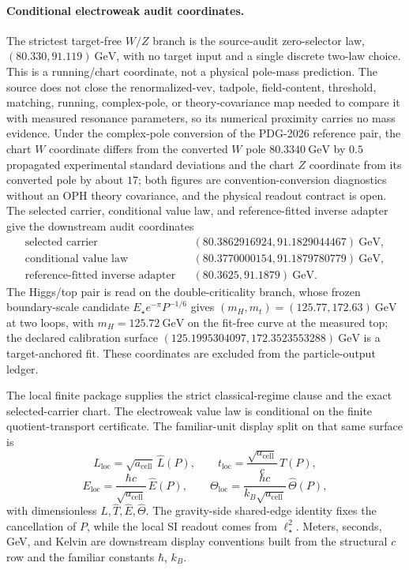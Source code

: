 \paragraph{Conditional electroweak audit coordinates.}
The strictest target-free \(W/Z\) branch is the source-audit zero-selector law,
\((80.330,91.119)~\mathrm{GeV}\), with no target input and a single discrete
two-law choice. This is a running/chart coordinate, not a physical pole-mass
prediction. The source does not close the renormalized-vev, tadpole,
field-content, threshold, matching, running, complex-pole, or theory-covariance
map needed to compare it with measured resonance parameters, so its numerical
proximity carries no mass evidence. Under the complex-pole conversion of the
PDG-2026 reference pair, the chart \(W\) coordinate differs from the converted
\(W\) pole \(80.3340~\mathrm{GeV}\) by \(0.5\) propagated experimental standard
deviations and the chart \(Z\) coordinate from its converted pole by about
\(17\); both figures are convention-conversion diagnostics without an OPH
theory covariance, and the physical readout contract is open. The
selected carrier, conditional value law, and reference-fitted inverse adapter give
the downstream audit coordinates
\[
\begin{array}{rcl}
\text{selected carrier} && (80.3862916924,91.1829044467)~\mathrm{GeV},\\
\text{conditional value law} && (80.3770000154,91.1879780779)~\mathrm{GeV},\\
\text{reference-fitted inverse adapter} && (80.3625,91.1879)~\mathrm{GeV}.
\end{array}
\]
The Higgs/top pair is read on the double-criticality branch, whose frozen
boundary-scale candidate \(E_\star e^{-\pi}P^{-1/6}\) gives
\((m_H,m_t)=(125.77,172.63)~\mathrm{GeV}\) at two loops, with
\(m_H=125.72~\mathrm{GeV}\) on the fit-free curve at the measured top; the
declared calibration surface
\((125.1995304097,172.3523553288)~\mathrm{GeV}\) is a target-anchored fit.
These coordinates are excluded from the particle-output ledger.

The local finite package supplies the strict classical-regime clause and the exact selected-carrier
chart. The electroweak value law is conditional on the finite quotient-transport certificate.
The familiar-unit display split on that same surface is
\[
L_{\mathrm{loc}}=\sqrt{a_{\mathrm{cell}}}\,\widehat L(P),\qquad
t_{\mathrm{loc}}=\frac{\sqrt{a_{\mathrm{cell}}}}{c}\,\widehat T(P),
\]
\[
E_{\mathrm{loc}}=\frac{\hbar c}{\sqrt{a_{\mathrm{cell}}}}\,\widehat E(P),\qquad
\Theta_{\mathrm{loc}}=\frac{\hbar c}{k_B\sqrt{a_{\mathrm{cell}}}}\,\widehat\Theta(P),
\]
with dimensionless \(\widehat L,\widehat T,\widehat E,\widehat\Theta\). The gravity-side
shared-edge identity fixes the cancellation of \(P\), while the local SI readout comes from
\(\ell_\star^2\). Meters, seconds, GeV, and Kelvin are downstream display conventions built from
the structural \(c\) row and the familiar constants \(\hbar\), \(k_B\).

